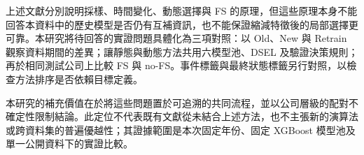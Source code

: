 上述文獻分別說明採樣、時間變化、動態選擇與 FS 的原理，但這些原理本身不能回答本資料中的歷史模型是否仍有互補資訊，也不能保證縮減特徵後的局部選擇更可靠。本研究將待回答的實證問題具體化為三項對照：以 Old、New 與 Retrain 觀察資料期間的差異；讓靜態與動態方法共用六模型池、DSEL 及驗證決策規則；再於相同測試公司上比較 FS 與 no-FS。事件標籤與最終狀態標籤另行對照，以檢查方法排序是否依賴目標定義。

本研究的補充價值在於將這些問題置於可追溯的共同流程，並以公司層級的配對不確定性限制結論。此定位不代表既有文獻從未結合上述方法，也不主張新的演算法或跨資料集的普遍優越性；其證據範圍是本次固定年份、固定 XGBoost 模型池及單一公開資料下的實證比較。
\endgroup

